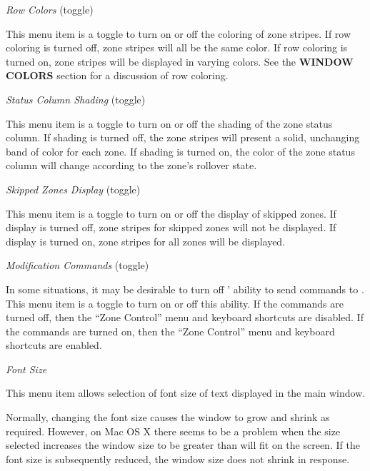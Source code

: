 \begin{description}

\item {\it Row Colors} (toggle)

This menu item is a toggle to turn on or off the coloring of zone stripes.
If row coloring is turned off, zone stripes will all be the same color.
If row coloring is turned on, zone stripes will be displayed in varying
colors.  See the {\bf WINDOW COLORS} section for a discussion of row coloring.

\item {\it Status Column Shading} (toggle)

This menu item is a toggle to turn on or off the shading of the zone status
column.  If shading is turned off, the zone stripes will present a solid,
unchanging band of color for each zone.  If shading is turned on, the color
of the zone status column will change according to the zone's rollover state.

\item {\it Skipped Zones Display} (toggle)

This menu item is a toggle to turn on or off the display of skipped zones.  If
display is turned off, zone stripes for skipped zones will not be displayed.
If display is turned on, zone stripes for all zones will be displayed.

\item {\it Modification Commands} (toggle)

In some situations, it may be desirable to turn off '
ability to send commands to .  This menu item is a toggle to turn
on or off this ability.  If the commands are turned off, then the ``Zone
Control'' menu and keyboard shortcuts are disabled.  If the commands are turned
on, then the ``Zone Control'' menu and keyboard shortcuts are enabled.

\item {\it Font Size}

This menu item allows selection of font size of text displayed in the main
window.

Normally, changing the font size causes the window to grow and shrink as
required.  However, on Mac OS X there seems to be a problem when the size
selected increases the window size to be greater than will fit on the screen.
If the font size is subsequently reduced, the window size does not shrink in
response.

\end{description}

